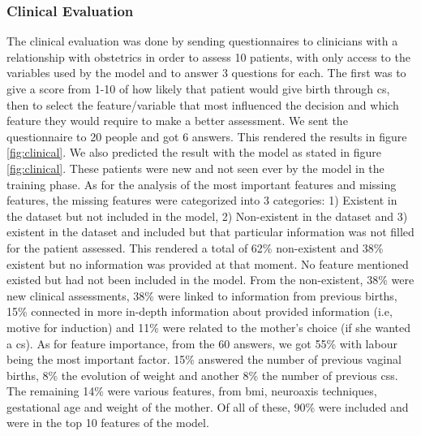 \subsubsection{Clinical Evaluation}
The clinical evaluation was done by sending questionnaires to clinicians with a relationship with obstetrics in order to assess 10 patients, with only access to the variables used by the model and to answer 3 questions for each. The first was to give a score from 1-10 of how likely that patient would give birth through \ac{cs}, then to select the feature/variable that most influenced the decision and which feature they would require to make a better assessment. We sent the questionnaire to 20 people and got 6 answers. This rendered the results in figure \ref{fig:clinical}. We also predicted the result with the model as stated in figure \ref{fig:clinical}. These patients were new and not seen ever by the model in the training phase. 
As for the analysis of the most important features and missing features, the missing features were categorized into 3 categories: 1) Existent in the dataset but not included in the model, 2) Non-existent in the dataset and 3) existent in the dataset and included but that particular information was not filled for the patient assessed. This rendered a total of 62\% non-existent and 38\% existent but no information was provided at that moment. No feature mentioned existed but had not been included in the model. From the non-existent, 38\% were new clinical assessments, 38\% were linked to information from previous births,  15\% connected in more in-depth information about provided information (i.e, motive for induction) and 11\% were related to the mother's choice (if she wanted a \ac{cs}).
As for feature importance, from the 60 answers, we got 55\% with labour being the most important factor. 15\% answered the number of previous vaginal births, 8\% the evolution of weight and another 8\% the number of previous \acp{cs}. The remaining 14\% were various features, from \ac{bmi}, neuroaxis techniques, gestational age and weight of the mother. Of all of these, 90\% were included and were in the top 10 features of the model.




